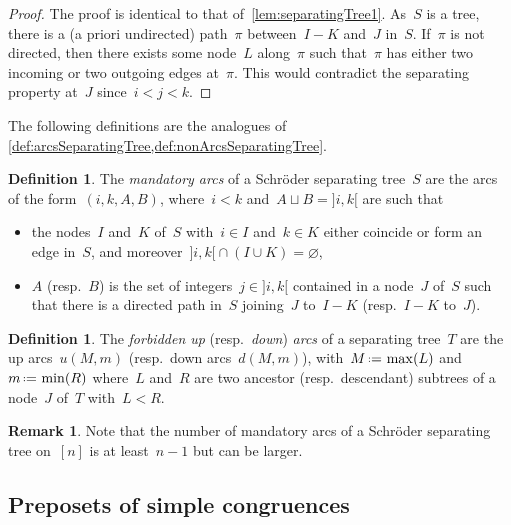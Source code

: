 \documentclass{amsart}
\theoremstyle{definition}
\newtheorem{definition}[theorem]{Definition}
\newtheorem{remark}[theorem]{Remark}
\newcommand{\eqdef}{\mbox{\,\raisebox{0.2ex}{\scriptsize\ensuremath{\mathrm:}}\ensuremath{=}\,}} %
\newcommand{\darkblue}{\color{darkblue}} %
\newcommand{\defn}[1]{\textsl{\darkblue #1}} %
\begin{document}
\begin{proof}
The proof is identical to that of~\cref{lem:separatingTree1}.
As~$S$ is a tree, there is a (a priori undirected) path~$\pi$ between~$I-K$ and~$J$ in~$S$.
If~$\pi$ is not directed, then there exists some node~$L$ along~$\pi$ such that~$\pi$ has either two incoming or two outgoing edges at~$\pi$.
This would contradict the separating property at~$J$ since~$i < j < k$.
\end{proof}

The following  definitions are the analogues of \cref{def:arcsSeparatingTree,def:nonArcsSeparatingTree}.

\begin{definition}
\label{def:arcsSchroderSeparatingTree}
The \defn{mandatory arcs} of a Schröder separating tree~$S$ are the arcs of the form~$(i, k, A, B)$, where~$i < k$ and~$A \sqcup B = {]i,k[}$ are such that
\begin{itemize}
\item the nodes~$I$ and~$K$ of~$S$ with~$i \in I$ and~$k \in K$ either coincide or form an edge in~$S$, and moreover~${]i,k[} \cap (I \cup K) = \varnothing$, 
\item $A$ (resp.~$B$) is the set of integers~$j \in {]i,k[}$ contained in a node~$J$ of~$S$ such that there is a directed path in~$S$ joining~$J$ to~$I-K$ (resp.~$I-K$ to~$J$).
\end{itemize}
\end{definition}

\begin{definition}
\label{def:arcsSchroderSeparatingTree}
The \defn{forbidden up} (resp.~\defn{down}) \defn{arcs} of a separating tree~$T$ are the up arcs~$u(M, m)$ (resp.~down arcs~$d(M, m)$), with~$M \eqdef \max(L)$ and~$m \eqdef \min(R)$ where~$L$ and~$R$ are two ancestor (resp.~descendant) subtrees of a node~$J$ of~$T$ with~$L < R$.
\end{definition}

\begin{remark}
Note that the number of mandatory arcs of a Schröder separating tree on~$[n]$ is at least~$n-1$ but can be larger.
\end{remark}


\subsection{Preposets of simple congruences}
\label{subsec:preposetsSimpleCongruences}
\end{document}
